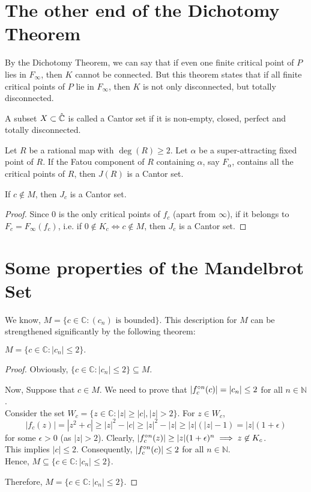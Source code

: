 \section{The other end of the Dichotomy Theorem}
By the Dichotomy Theorem, we can say that if even one finite critical point of \( P \) lies in \( F_\infty \), then \( K \)
cannot be connected. But this theorem states that if all finite critical points of \( P \) lie in \( F_\infty \), then
\( K \) is not only disconnected, but totally disconnected.

\begin{definition}
	A subset \( X\subset \hat{\mathbb{C}} \) is called a Cantor set if it is non-empty, closed, perfect and totally disconnected.
\end{definition}

\begin{theorem}
	Let \( R \) be a rational map with \( \deg(R)\ge 2 \). Let \( \alpha \) be a super-attracting fixed
	point of \( R \). If the Fatou component of \( R \) containing \( \alpha \), say \( F_\alpha \),
	contains all the critical points of \( R \), then \( J(R) \) is a Cantor set.
\end{theorem}

\begin{corollary}
	If \( c\not\in M \), then \( J_c \) is a Cantor set.
\end{corollary}
\begin{proof}
	Since \( 0 \) is the only critical points of \( f_c \) (apart from \( \infty \)), if it belongs to \( F_c=F_\infty(f_c) \), 
	i.e. if \( 0\not\in K_c \iff c\not\in M \), then \( J_c \) is a Cantor set.
\end{proof}

\section{Some properties of the Mandelbrot Set}
We know, \( M=\{c\in \mathbb{C}:(c_n)\text{ is bounded}\} \). 
This description for \( M \) can be strengthened significantly by the following theorem:
\begin{theorem}\label{thm4.1}
	\( M=\{c\in \mathbb{C}:|c_n|\le 2 \}.\)
\end{theorem}
\begin{proof}Obviously, \( \{c\in \mathbb{C}:|c_n|\le 2\}  \subseteq M\).

	Now, Suppose that \( c\in M \). We need to prove that \( |\fcof[n](c)|=|c_n|\le 2 \) for all \( n\in \mathbb{N} \).\\
	Consider the set \( W_c=\{z\in \mathbb{C}:|z|\ge |c|,|z|>2\} \). For \( z\in W_c \),\[
		|f_c(z)|=|z^2+c|\ge |z|^2-|c|\ge |z|^2-|z|\ge |z|(|z|-1)=|z|(1+\epsilon)
	\] for some \( \epsilon>0 \) (as \( |z|>2 \)). Clearly, \( |\fcof[n](z)|\ge |z|(1+\epsilon)^n \implies z\not\in K_c\).\\
	This implies \( |c|\le 2 \). Consequently, \( |\fcof[n](c)|\le 2 \) for all \( n\in \mathbb{N} \).\\
	Hence, \( M\subseteq  \{c\in \mathbb{C}:|c_n|\le 2 \} \).

	Therefore, \( M=\{c\in \mathbb{C}:|c_n|\le 2\} \).
\end{proof}

